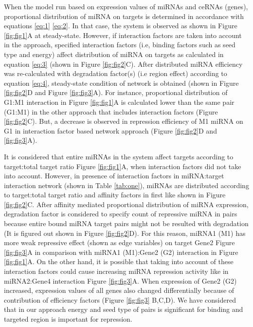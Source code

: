 \documentclass[a4,center,fleqn]{NAR}
\begin{document}
When the model run based on expression values of miRNAs and ceRNAs
(genes), proportional distribution of miRNA on targets is determined in
accordance with equations \eqref{eq:1} \eqref{eq:2}. In that case, the
system is observed as shown in Figure \ref{fig:fig1}A at steady-state.
However, if interaction factors are taken into account in the approach,
specified interaction factors (i.e, binding factors such as seed type
and energy) affect distribution of miRNA on targets as calculated in
equation \eqref{eq:3} (shown in Figure \ref{fig:fig2}C). After
distributed miRNA efficiency was re-calculated with degradation
factor(s) (i.e region effect) according to equation \eqref{eq:4},
steady-state condition of network is obtained (shown in Figure
\ref{fig:fig2}D and Figure \ref{fig:fig3}A). For instance, proportional
distribution of G1:M1 interaction in Figure \ref{fig:fig1}A is
calculated lower than the same pair (G1:M1) in the other approach that
includes interaction factors (Figure \ref{fig:fig2}C). But, a decrease
is observed in repression efficiency of M1 miRNA on G1 in interaction
factor based network approach (Figure \ref{fig:fig2}D and
\ref{fig:fig3}A).

It is considered that entire miRNAs in the system affect targets
according to target:total target ratio Figure \ref{fig:fig1}A, when
interaction factors did not take into account. However, in presence of
interaction factors in miRNA:target interaction network (shown in Table
\ref{tab:one}), miRNAs are distributed according to target:total target
ratio and affinity factors in first like shown in Figure
\ref{fig:fig2}C. After affinity mediated proportional distribution of
miRNA expression, degradation factor is considered to specify count of
repressive miRNA in pairs because entire bound miRNA target pairs might
not be resulted with degradation (It is figured out shown in Figure
\ref{fig:fig2}D). For this reason, miRNA1 (M1) has more weak repressive
effect (shown as edge variables) on target Gene2 Figure \ref{fig:fig3}A
in comparison with miRNA1 (M1):Gene2 (G2) interaction in Figure
\ref{fig:fig1}A. On the other hand, it is possible that taking into
account of these interaction factors could cause increasing miRNA
repression activity like in miRNA2:Gene4 interaction Figure
\ref{fig:fig3}A. When expression of Gene2 (G2) increased, expression
values of all genes also changed differentially because of contribution
of efficiency factors (Figure \ref{fig:fig3} B,C,D). We have considered
that in our approach energy and seed type of pairs is significant for
binding and targeted region is important for repression.
\end{document}
